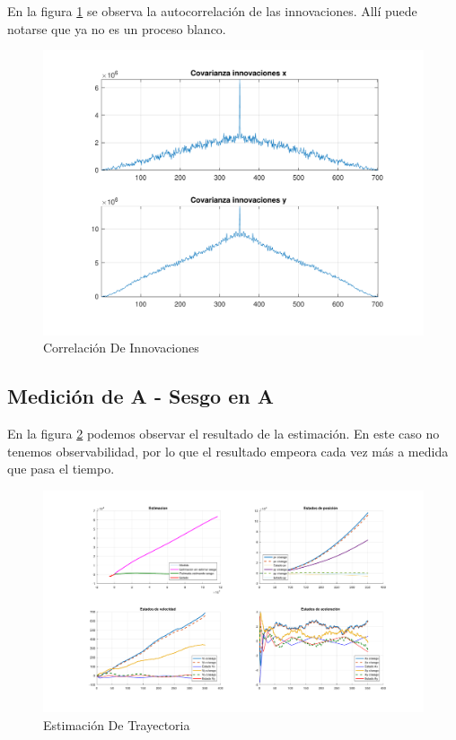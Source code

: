 	En la figura \ref{fig:ej4d_cov} se observa la autocorrelación de las innovaciones. Allí puede notarse que ya no es un proceso blanco.
	
	\begin{figure}[H]
		\centering
		\includegraphics[width=1.0\textwidth,keepaspectratio]{Figuras/covinn_ej4d.pdf}
		\caption{Correlación De Innovaciones}
		\label{fig:ej4d_cov}
	\end{figure}


\subsection{Medición de A - Sesgo en A}

	En la figura \ref{fig:ej4e} podemos observar el resultado de la estimación. En este caso no tenemos observabilidad, por lo que el resultado empeora cada vez más a medida que pasa el tiempo.

	\begin{figure}[H]
		\centering
		\includegraphics[scale=0.5,trim={6,5cm 0 0 0}]{Figuras/graf_ej4e.pdf}
		\caption{Estimación De Trayectoria}
		\label{fig:ej4e}
	\end{figure}
	
